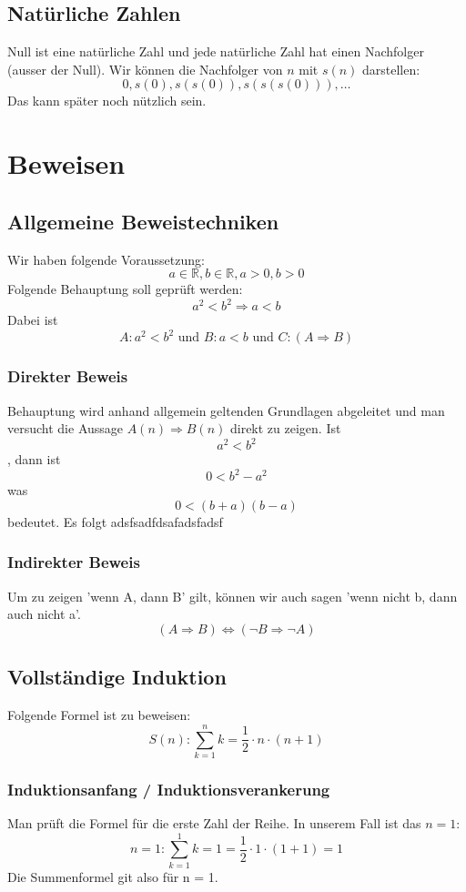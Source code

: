 \subsection{Natürliche Zahlen}
  Null ist eine natürliche Zahl und jede natürliche Zahl hat einen Nachfolger (ausser der Null).
  Wir können die Nachfolger von $n$ mit $s(n)$ darstellen:
  \[ 0, s(0), s(s(0)), s(s(s(0))), \dots \]
  Das kann später noch nützlich sein.

\section{Beweisen}
\subsection{Allgemeine Beweistechniken}
Wir haben folgende Voraussetzung:
  \[ a \in \mathbb{R}, b \in \mathbb{R}, a > 0, b > 0 \]
  Folgende Behauptung soll geprüft werden:
  \[ a^2 < b^2 \Rightarrow a < b \]
  Dabei ist
  \[ A: a^2 < b^2 \text{ und } B: a < b \text{ und } C: (A \Rightarrow B) \]
  \subsubsection{Direkter Beweis}
  Behauptung wird anhand allgemein geltenden Grundlagen abgeleitet und man versucht die Aussage $A(n) \Rightarrow B(n)$ direkt zu zeigen.
  Ist \[a^2 < b^2\], dann ist \[0 < b^2 - a^2\] was \[0 < (b + a)(b - a)\] bedeutet. Es folgt 
  adsfsadfdsafadsfadsf
  \subsubsection{Indirekter Beweis}
  Um zu zeigen 'wenn A, dann B' gilt, können wir auch sagen 'wenn nicht b, dann auch nicht a'.
  \[ (A \Rightarrow B) \Leftrightarrow (\neg B \Rightarrow \neg A) \]

\subsection{Vollständige Induktion}
Folgende Formel ist zu beweisen:
\[ S(n): \sum\limits_{k=1}^n k = \frac{1}{2} \cdot n \cdot (n + 1)\]
\subsubsection{Induktionsanfang / Induktionsverankerung}
Man prüft die Formel für die erste Zahl der Reihe. In unserem Fall ist
das $n = 1$:
\[ n = 1: \sum\limits_{k=1}^1 k = 1 = \frac{1}{2} \cdot 1 \cdot (1 + 1) = 1\]
Die Summenformel git also für n = 1.

